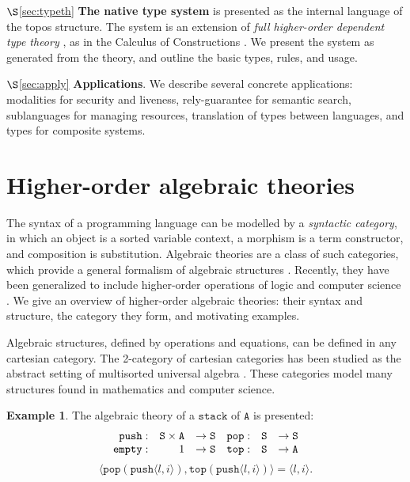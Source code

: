 \documentclass[12pt]{article}
\theoremstyle{definition}
\newtheorem{example}[theorem]{Example}
\newcommand{\mrm}[1]{\mathrm{#1}}
\newcommand{\mtt}[1]{\mathtt{#1}}
\newcommand{\Set}{\mrm{Set}}
\newcommand{\tts}{\mtt{S}}
\begin{document}
$\S$\ref{sec:typeth} \textbf{The native type system} is presented as the internal language of the topos structure. The system is an extension of \textit{full higher-order dependent type theory} \cite{jacobs}, as in the Calculus of Constructions \cite{coc}. We present the system as generated from the theory, and outline the basic types, rules, and usage.

$\S$\ref{sec:apply} \textbf{Applications}. We describe several concrete applications: modalities for security and liveness, rely-guarantee for semantic search, sublanguages for managing resources, translation of types between languages, and types for composite systems.



\section{Higher-order algebraic theories}
\label{algthy}

The syntax of a programming language can be modelled by a \textit{syntactic category}, in which an object is a sorted variable context, a morphism is a term constructor, and composition is substitution. Algebraic theories are a class of such categories, which provide a general formalism of algebraic structures \cite{algthys}. Recently, they have been generalized to include higher-order operations of logic and computer science \cite{hoat}. We give an overview of higher-order algebraic theories: their syntax and structure, the category they form, and motivating examples.


Algebraic structures, defined by operations and equations, can be defined in any cartesian category. The 2-category of cartesian categories has been studied as the abstract setting of multisorted universal algebra \cite{algthys}. These categories model many structures found in mathematics and computer science.

\begin{example}
The algebraic theory of a $\mtt{stack}$ of $\mtt{A}$ is presented:
\[\begin{array}{rrl@{\quad}rrl}
    \mtt{push}: & \tts\times \mtt{A} &\to \tts & \mtt{pop}: & \tts & \to \tts\\
    \mtt{empty}: & 1 & \to \tts & \mtt{top}: & \tts & \to \mtt{A}
\end{array}\]
\[\langle\mtt{pop}(\mtt{push}\langle l,i\rangle),\mtt{top}(\mtt{push}\langle l,i\rangle) \rangle = \langle l,i\rangle.\]
\end{example}
\end{document}
